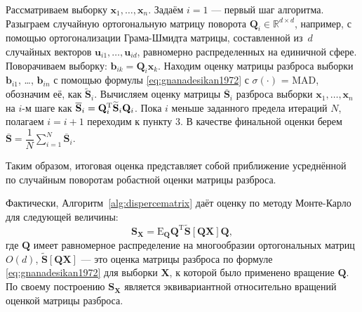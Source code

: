 \begin{algorithm}[H]
\caption{Вычисление оценки матрицы разброса с помощью случайных вращений выборки}
\begin{algorithmic}[1]
			\State Рассматриваем выборку $\mathbf{x}_1,\ldots,\mathbf{x}_{{n}}$. 
			\State Задаём $i=1$ --- первый шаг алгоритма. 
			\State Разыграем случайную ортогональную матрицу поворота $\mathbf{Q}_i \in \mathbb{R}^{d \times d}$, например, с помощью ортогонализации Грама-Шмидта матрицы, составленной из~$d$ случайных векторов $\mathbf{u}_{i1}, \ldots, \mathbf{u}_{id}$, равномерно распределенных на единичной сфере.
			\State Поворачиваем выборку: $\mathbf{b}_{ik} = \mathbf{Q}_i \mathbf{x}_{k}$.
			\State Находим оценку матрицы разброса выборки $\mathbf{b}_{i1}$, \ldots, $\mathbf{b}_{in}$ с помощью формулы \eqref{eq:gnanadesikan1972} с $\sigma(\cdot)$ = MAD, обозначим её, как $\widetilde{\mathbf{S}}_i$.
            \State Вычисляем оценку матрицы $\overline{\mathbf{S}}_i $ разброса выборки $\mathbf{x}_1,\ldots,\mathbf{x}_{{n}}$ на $i$-м шаге как $\overline{\mathbf{S}}_i = \mathbf{Q}_i^{\mathrm{T}} \widetilde{\mathbf{S}}_i \mathbf{Q}_i$.
            \State Пока $i$ меньше заданного предела итераций $N$, полагаем $i = i + 1$ переходим к пункту 3.
			\State В качестве финальной оценки берем $\overline{\mathbf{S}} = \dfrac{1}{N} \sum\limits_{i=1}^{N}  \overline{\mathbf{S}}_i$.
\end{algorithmic}
\label{alg:dispercematrix}
\end{algorithm}
Таким образом, итоговая оценка представляет собой приближение усреднённой по случайным поворотам робастной оценки матрицы разброса.

Фактически, Алгоритм~\ref{alg:dispercematrix} даёт оценку по методу Монте-Карло для следующей величины:
\begin{equation*}
    \mathbf{S}_{\mathbf{X}} = \mathrm{E_{\mathbf{Q}}} \mathbf{Q}^{\mathrm{T}} \widetilde{\mathbf{S}}\left[\mathbf{Q} \mathbf{X}\right] \mathbf{Q},
\end{equation*}
где $\mathbf{Q}$ имеет равномерное распределение на многообразии ортогональных матриц $O(d)$, $\widetilde{\mathbf{S}}\left[\mathbf{Q} \mathbf{X}\right]$ --- это оценка матрицы разброса по формуле \eqref{eq:gnanadesikan1972} для выборки $\mathbf{X}$, к которой было применено вращение $\mathbf{Q}$. По своему построению $\mathbf{S}_{\mathbf{X}}$ является эквивариантной относительно вращений оценкой матрицы разброса.


